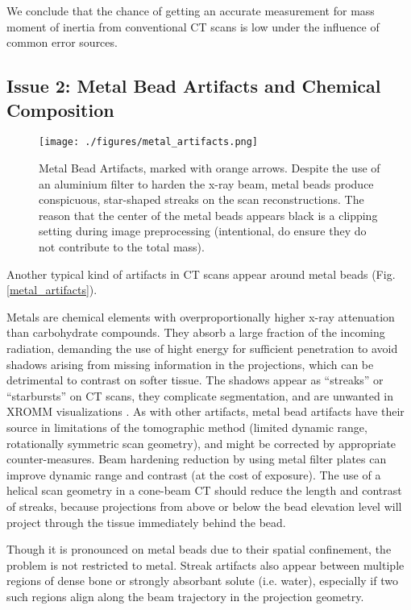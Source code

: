 We conclude that the chance of getting an accurate measurement for mass moment of inertia from conventional CT scans is low under the influence of common error sources.



\subsection{Issue 2: Metal Bead Artifacts and Chemical Composition}
\label{sec:orgd9f8ffb}

\begin{figure}[htbp]
\centering
\texttt{[image: ./figures/metal\_artifacts.png]}
\caption{\label{fig:metal_artifacts}Metal Bead Artifacts, marked with orange arrows. Despite the use of an aluminium filter to harden the x-ray beam, metal beads produce conspicuous, star-shaped streaks on the scan reconstructions. The reason that the center of the metal beads appears black is a clipping setting during image preprocessing (intentional, do ensure they do not contribute to the total mass).}
\end{figure}

Another typical kind of artifacts in CT scans appear around metal beads (Fig. \ref{metal_artifacts}).

Metals are chemical elements with overproportionally higher x-ray attenuation than carbohydrate compounds.
They absorb a large fraction of the incoming radiation, demanding the use of hight energy for sufficient penetration to avoid shadows arising from missing information in the projections, which can be detrimental to contrast on softer tissue.
The shadows appear as ``streaks'' or ``starbursts'' on CT scans, they complicate segmentation, and are unwanted in XROMM visualizations \citep{Brainerd2010}.
As with other artifacts, metal bead artifacts have their source in limitations of the tomographic method (limited dynamic range, rotationally symmetric scan geometry), and might be corrected by appropriate counter-measures.
Beam hardening reduction by using metal filter plates can improve dynamic range and contrast (at the cost of exposure).
The use of a helical scan geometry in a cone-beam CT should reduce the length and contrast of streaks, because projections from above or below the bead elevation level will project through the tissue immediately behind the bead.

Though it is pronounced on metal beads due to their spatial confinement, the problem is not restricted to metal.
Streak artifacts also appear between multiple regions of dense bone or strongly absorbant solute (i.e. water), especially if two such regions align along the beam trajectory in the projection geometry.


